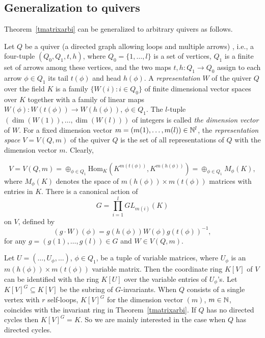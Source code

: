 \documentclass[11pt]{article}
\begin{document}
\subsection{Generalization to quivers} \label{squiver}
Theorem~\ref{tmatrixarbi} can be generalized to arbitrary quivers as follows.

Let $Q$ be a quiver  (a directed graph allowing loops and multiple arrows) \cite{procesiquiver,weyman}, i.e., a four-tuple $(Q_0,Q_1,t,h)$, where $Q_0=\{1,\ldots,l\}$ is a set of vertices,
$Q_1$ is a finite set of arrows among these vertices, and the two maps $t,h: Q_1 \rightarrow Q_0$ assign to each arrow 
$\phi \in Q_1$ its tail $t(\phi)$ and head $h(\phi)$. 
A {\em representation} $W$ of the quiver  $Q$ over the   field $K$
is a family $\{W(i): i \in Q_0\}$ of finite dimensional vector spaces over $K$ 
together with a family of linear maps $W(\phi): W(t(\phi)) \rightarrow W(h(\phi))$,
$\phi \in Q_1$. The $l$-tuple  $(\dim(W(1)), \ldots, \dim(W(l)))$ 
of integers is called {\em the dimension vector} of $W$. 
For a fixed dimension vector $m=(m(1),\ldots, m(l)) \in \mathbb{N}^l$,
 the {\em representation space}
$V=V(Q,m)$ of the quiver $Q$ is  the set of all representations  of $Q$ with the dimension vector $m$.
Clearly,

\begin{equation} \label{eqquiver}
V=V(Q,m)= \oplus_{\phi \in Q_1} \mbox{Hom}_K (K^{m(t(\phi))}, K^{m(h(\phi))}) = \oplus_{\phi \in Q_1} M_\phi(K),
\end{equation}
where $M_\phi(K)$ denotes the space of $m(h(\phi)) \times m(t(\phi))$ matrices with entries in $K$. 
There is a canonical action of 
\begin{equation} \label{eqG}
 G=\prod_{i=1}^l GL_{m(i)} (K)
\end{equation}
on $V$,  defined by 
\[ (g \cdot W) (\phi) = g(h(\phi)) W(\phi) g (t(\phi))^{-1}, \] 
for any  $g=(g(1),\ldots,g(l)) \in G$ and $W \in V(Q,m)$.

Let $U=(\ldots,U_\phi,\ldots)$, $\phi \in Q_1$,  be a tuple of 
variable  matrices,  where $U_\phi$ is an $m(h(\phi)) \times m(t(\phi))$ variable matrix.
Then the  coordinate ring $K[V]$ of $V$ can be identified with the ring $K[U]$ over the variable entries of $U_\phi$'s.
Let  $K[V]^G \subseteq K[V]$  be the subring of $G$-invariants. 
When $Q$ consists of a single vertex with $r$ self-loops,
$K[V]^G$ for the dimension vector $(m)$, $m \in \mathbb{N}$, 
coincides with the invariant ring  in Theorem~\ref{tmatrixarbi}. 
If $Q$ has no directed cycles then $K[V]^G=K$.  So we are mainly interested in the
case when $Q$ has directed cycles. 
\end{document}
